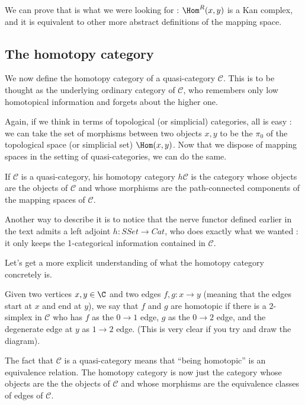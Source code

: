 We can prove that is what we were looking for :  $\Hom^R(x,y)$ is a Kan complex, and it is equivalent to other more abstract definitions of the mapping space.



\subsection{The homotopy category}

We now define the homotopy category of a quasi-category $\mathcal C$. This is to be thought as the underlying ordinary category of $\mathcal C$, who remembers only low homotopical information and forgets about the higher one. 

Again, if we think in terms of topological (or simplicial) categories, all is easy : we can take the set of morphisms between two objects $x,y$ to be the $\pi_0$ of the topological space (or simplicial set) $\Hom (x,y)$. Now that we dispose of mapping spaces in the setting of quasi-categories, we can do the same.

\begin{defin}
If $\mathcal C$ is a  quasi-category, his homotopy category $h\mathcal C$ is the category whose objects are the objects of $\mathcal C$ and whose morphisms are the path-connected components of the mapping spaces of $\mathcal C$.
\end{defin}

Another way to describe it is to notice that the nerve functor defined earlier in the text admits a left adjoint $h: SSet \to Cat$, who does exactly what we wanted : it only keeps the 1-categorical information contained in $\mathcal C$.

Let's get a more explicit understanding of what the homotopy category concretely is.

Given two vertices $x,y \in \C$ and two edges $f,g : x \to y$ (meaning that the edges start at $x$ and end at $y$), we say that $f$ and $g$ are homotopic if there is a $2$-simplex in $\mathcal C$ who has $f$ as the $0\to 1$ edge, $g$ as the $0\to 2$ edge, and the degenerate edge at $y$ as $1 \to 2$ edge. (This is very clear if you try and draw the diagram).

The fact that $\mathcal C$ is a quasi-category means that ``being homotopic'' is an equivalence relation. The homotopy category is now just the category whose objects are the the objects of $\mathcal C$ and whose morphisms are the equivalence classes of edges of $\mathcal C$.




